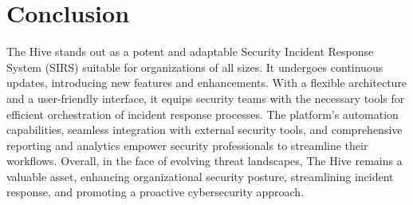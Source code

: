 \documentclass{article}
\begin{document}
\section{Conclusion}
The Hive stands out as a potent and adaptable Security Incident Response System (SIRS) suitable for organizations of all sizes. It undergoes continuous updates, introducing new features and enhancements. With a flexible architecture and a user-friendly interface, it equips security teams with the necessary tools for efficient orchestration of incident response processes. The platform's automation capabilities, seamless integration with external security tools, and comprehensive reporting and analytics empower security professionals to streamline their workflows. Overall, in the face of evolving threat landscapes, The Hive remains a valuable asset, enhancing organizational security posture, streamlining incident response, and promoting a proactive cybersecurity approach.
\end{document}
